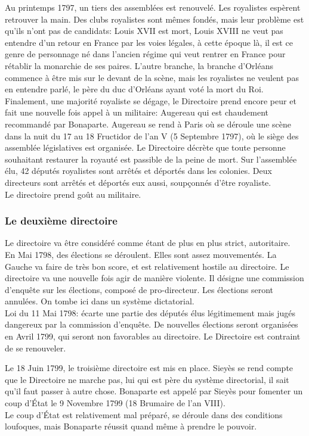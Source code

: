 \documentclass[10pt, a4paper, openany]{book}
\begin{document}
Au printemps 1797, un tiers des assemblées est renouvelé. Les royalistes espèrent retrouver la main. Des clubs royalistes sont mêmes fondés, mais leur problème est qu'ils n'ont pas de candidats: Louis XVII est mort, Louis XVIII ne veut pas entendre d'un retour en France par les voies légales, à cette époque là, il est ce genre de personnage né dans l'ancien régime qui veut rentrer en France pour rétablir la monarchie de ses paires. L'autre branche, la branche d'Orléans commence à être mis sur le devant de la scène, mais les royalistes ne veulent pas en entendre parlé, le père du duc d'Orléans ayant voté la mort du Roi. \\
Finalement, une majorité royaliste se dégage, le Directoire prend encore peur et fait une nouvelle fois appel à un militaire: Augereau qui est chaudement recommandé par Bonaparte. Augereau se rend à Paris où se déroule une scène dans la nuit du 17 au 18 Fructidor de l'an V (5 Septembre 1797), où le siège des assemblée législatives est organisée. Le Directoire décrète que toute personne souhaitant restaurer la royauté est passible de la peine de mort. Sur l'assemblée élu, 42 députés royalistes sont arrêtés et déportés dans les colonies. Deux directeurs sont arrêtés et déportés eux aussi, soupçonnés d'être royaliste. \\
Le directoire prend goût au militaire. 

\subsubsection{Le deuxième directoire}

Le directoire va être considéré comme étant de plus en plus strict, autoritaire. \\
En Mai 1798, des élections se déroulent. Elles sont assez mouvementés. La Gauche va faire de très bon score, et est relativement hostile au directoire. Le directoire va une nouvelle fois agir de manière violente. Il désigne une commission d'enquête sur les élections, composé de pro-directeur. Les élections seront annulées. On tombe ici dans un système dictatorial. \\
Loi du 11 Mai 1798: écarte une partie des députés élus légitimement mais jugés dangereux par la commission d'enquête. De nouvelles élections seront organisées en Avril 1799, qui seront non favorables au directoire. Le Directoire est contraint de se renouveler. 


Le 18 Juin 1799, le troisième directoire est mis en place. Sieyès se rend compte que le Directoire ne marche pas, lui qui est père du système directorial, il sait qu'il faut passer à autre chose. Bonaparte est appelé par Sieyès pour fomenter un coup d'État le 9 Novembre 1799 (18 Brumaire de l'an VIII). \\
Le coup d'État est relativement mal préparé, se déroule dans des conditions loufoques, mais Bonaparte réussit quand même à prendre le pouvoir. 
\end{document}

